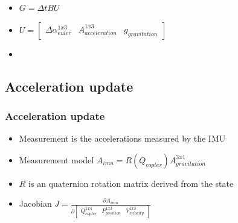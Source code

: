 \documentclass{beamer}
\begin{document}
\begin{frame}
  \begin{itemize}
  \item $G = \Delta tBU$
  \item $U = \begin{bmatrix}\Delta\alpha_{euler}^{1x3} & A_{acceleration}^{1x3} & g_{gravitation}\end{bmatrix}$
  \item {} 
  \end{itemize} 
\end{frame}



\subsection{Acceleration update}
\begin{frame}
\frametitle{Acceleration update}
  \begin{itemize}
  \item Measurement is the accelerations measured by the IMU
  \item Measurement model $A_{imu} = R(Q_{copter})A_{gravitation}^{3x1}$
  \item $R$ is an quaternion rotation matrix derived from the state
  \item Jacobian $J = \frac{\partial A_{imu}}{\partial \begin{bmatrix}Q_{copter}^{1x4} & P_{position}^{1x3} & V_{velocity}^{1x3}\end{bmatrix}}$
  \end{itemize} 
\end{frame}
\end{document}
